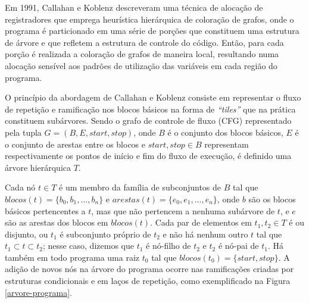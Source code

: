 \documentclass[
	12pt,				%
	openright,			%
	oneside,			%
	a4paper,			%
	tccpreliminar,			%
	]{ABNT-DC-UEL}
\begin{document}
Em 1991, Callahan e Koblenz \cite{callahan:91} descreveram uma técnica de alocação de registradores que emprega heurística hierárquica de coloração de grafos, onde o programa é particionado em uma série de porções que constituem uma estrutura de árvore e que refletem a estrutura de controle do código. Então, para cada porção é realizada a coloração de grafos de maneira local, resultando numa alocação sensível aos padrões de utilização das variáveis em cada região do programa.

O princípio da abordagem de Callahan e Koblenz consiste em representar o fluxo de repetição e ramificação nos blocos básicos na forma de \textit{``tiles''} que na prática constituem subárvores. Sendo o grafo de controle de fluxo (CFG) representado pela tupla $G = (B, E, \textit{start}, \textit{stop})$, onde $B$ é o conjunto dos blocos básicos, $E$ é o conjunto de arestas entre os blocos e $\mathit{start}, \textit{stop} \in B$ representam respectivamente os pontos de início e fim do fluxo de execução, é definido uma árvore hierárquica $T$.

Cada nó $t \in T$ é um membro da família de subconjuntos de $B$ tal que $\mathit{blocos}(t) = \{b_0, b_1, \dots, b_n\}$ e $\mathit{arestas}(t)=\{e_0, e_1, \dots, e_n\}$, onde $b$ são os blocos básicos pertencentes a $t$, mas que não pertencem a nenhuma subárvore de $t$, e $e$ são as arestas dos blocos em $\mathit{blocos}(t)$. Cada par de elementos em $t_1, t_2 \in T$ é ou disjunto, ou $t_1$ é subconjunto próprio de $t_2$ e não há nenhum outro $t$ tal que $t_1 \subset t \subset t_2$; nesse caso, dizemos que $t_1$ é nó-filho de $t_2$ e $t_2$ é nó-pai de $t_1$. Há também em todo programa uma raiz $t_0$ tal que $\mathit{blocos}(t_0) = \{\mathit{start}, \mathit{stop}\}$. A adição de novos nós na árvore do programa ocorre nas ramificações criadas por estruturas condicionais e em laços de repetição, como exemplificado na Figura \ref{arvore-programa}.
\end{document}
